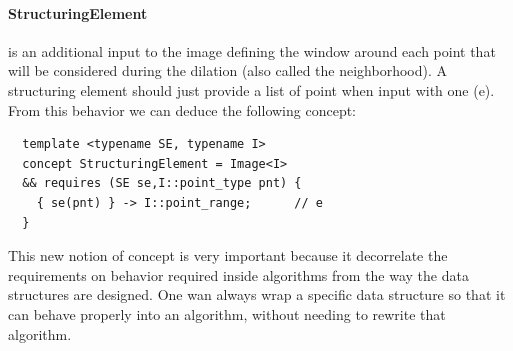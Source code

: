 \paragraph{StructuringElement} is an additional input to the image defining the window around each point that will be
considered during the dilation (also called the neighborhood). A structuring element should just provide a list of point
when input with one (e). From this behavior we can deduce the following concept:
\begin{verbatim}
  template <typename SE, typename I>
  concept StructuringElement = Image<I>
  && requires (SE se,I::point_type pnt) {
    { se(pnt) } -> I::point_range;      // e
  }
\end{verbatim}

This new notion of concept is very important because it decorrelate the requirements on behavior required inside
algorithms from the way the data structures are designed. One wan always wrap a specific data structure so that it can
behave properly into an algorithm, without needing to rewrite that algorithm.


